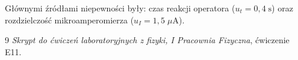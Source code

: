\documentclass[12pt, a4paper]{article}
\begin{document}
Głównymi źródłami niepewności były: czas reakcji operatora ($u_t = 0{,}4\;\mathrm{s}$)
oraz rozdzielczość mikroamperomierza ($u_I = 1{,}5\;\mu\mathrm{A}$).

\begin{thebibliography}{9}
\textit{Skrypt do ćwiczeń laboratoryjnych z fizyki, I Pracownia Fizyczna}, ćwiczenie E11.
\end{thebibliography}
\end{document}
